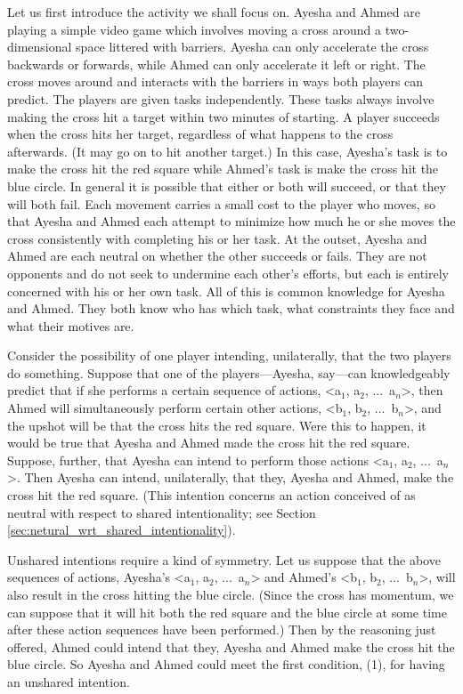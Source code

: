 \documentclass[12pt,\papersize]{extarticle}
\begin{document}
Let us first introduce the activity we shall focus on.
Ayesha and Ahmed  are playing a simple video game which involves moving a cross around a two-dimensional space littered with barriers.
Ayesha can only accelerate the cross backwards or forwards,
while Ahmed can only accelerate it left or right. 
The cross moves around and interacts with the barriers in ways both players can predict.
The players are given tasks independently. 
These tasks always involve making the cross hit a target within two minutes of starting. 
A player succeeds when the cross hits her target, regardless of what happens to the cross afterwards.  
(It may go on to hit another target.)
In this case, 
	Ayesha's task is to make the cross hit the red square
	while
	Ahmed's task is make the cross hit the blue circle. 
In general it is possible that either or both will succeed, or that they will both fail.
Each movement carries a small cost to the player who moves, so that Ayesha and Ahmed each attempt to minimize how much he or she moves the cross consistently with completing his or her task.
At the outset, 
Ayesha and Ahmed are each neutral on whether the other succeeds or fails.
They are not opponents and do not seek to undermine each other's efforts, but each is entirely concerned  with his or her own task.
All of this is common knowledge for Ayesha and Ahmed.
They both know who has which task, what constraints they face and what their motives are.

Consider the possibility of one player intending, unilaterally, that the two players do something.
Suppose that one of the players---Ayesha, say---can knowledgeably predict that if she performs a certain sequence of actions, <a$_1$, a$_2$, ...\ a$_n$>, then Ahmed will simultaneously perform certain other actions, <b$_1$, b$_2$, ...\ b$_n$>,
 and the upshot will be that the cross hits the red square.
Were this to happen, it would be true that Ayesha and Ahmed made the cross hit the red square.
Suppose, further, that Ayesha can intend to perform those actions <a$_1$, a$_2$, ...\ a$_n$>.
Then Ayesha can intend, unilaterally, that they, Ayesha and Ahmed, make the cross hit the red square.
(This intention concerns an action conceived of as neutral with respect to shared intentionality; see  Section \vref{sec:netural_wrt_shared_intentionality}).

Unshared intentions require a kind of symmetry.
Let us suppose that the above sequences of actions,
	Ayesha's <a$_1$, a$_2$, ...\ a$_n$>  and 
	Ahmed's <b$_1$, b$_2$, ...\ b$_n$>,
will also result in the cross hitting the blue circle. 
(Since the cross has momentum, we can suppose that it will hit both the red square and the blue circle at some time after these action sequences have been performed.)
Then by the reasoning just offered, Ahmed could intend that they, Ayesha and Ahmed make the cross hit the blue circle.
So Ayesha and Ahmed could meet the first condition, (1), for having an unshared intention.
\end{document}
